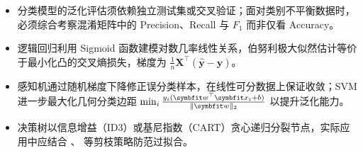 \begin{summary}[本章要点]
\begin{itemize}
  \item 分类模型的泛化评估须依赖独立测试集或交叉验证；面对类别不平衡数据时，必须综合考察混淆矩阵中的 Precision、Recall 与 $F_1$ 而非仅看 Accuracy。
  \item 逻辑回归利用 Sigmoid 函数建模对数几率线性关系，伯努利极大似然估计等价于最小化凸的交叉熵损失，梯度为 $\frac{1}{n}\bm{X}^\top(\hat{\bm{y}}-\bm{y})$。
  \item 感知机通过随机梯度下降修正误分类样本，在线性可分数据上保证收敛；SVM 进一步最大化几何分类边距 $\min_i \frac{y_i(\bm{w}^\top\bm{x}_i+b)}{\norm{\bm{w}}_2}$ 以提升泛化能力。
  \item 决策树以信息增益（ID3）或基尼指数（CART）贪心递归分裂节点，实际应用中应结合 、 等剪枝策略防范过拟合。
\end{itemize}
\end{summary}
